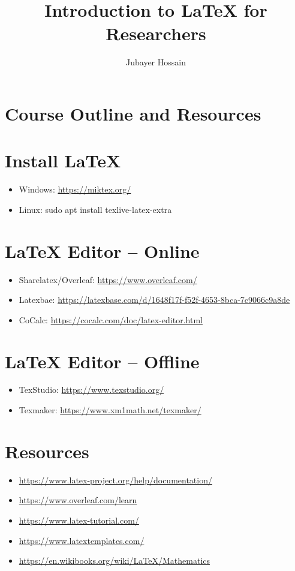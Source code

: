 \documentclass[a4paper, 12pt]{article}
\title{Introduction to {\LaTeX} for Researchers}
\author{\LARGE Jubayer Hossain}
\begin{document}
\maketitle 
\section*{\LARGE Course Outline and Resources}


\section*{Install \LaTeX} 
\begin{itemize}
	\item Windows: \url{https://miktex.org/}
	\item Linux: sudo apt install texlive-latex-extra
\end{itemize}


\section*{{\LaTeX} Editor -- Online}
\begin{itemize}
	\item Sharelatex/Overleaf: \url{https://www.overleaf.com/}
	\item Latexbae: 
	\url{https://latexbase.com/d/1648f17f-f52f-4653-8bca-7c9066c9a8de}
	\item CoCalc: \url{https://cocalc.com/doc/latex-editor.html}
\end{itemize}


\section*{{\LaTeX} Editor -- Offline}
\begin{itemize}
	\item TexStudio: \url{https://www.texstudio.org/}
	\item Texmaker: \url{https://www.xm1math.net/texmaker/}
\end{itemize}


\section*{Resources} 
\begin{itemize}
	\item \url{https://www.latex-project.org/help/documentation/}
	\item \url{https://www.overleaf.com/learn}
	\item \url{https://www.latex-tutorial.com/}
	\item \url{https://www.latextemplates.com/} 
	\item \url{https://en.wikibooks.org/wiki/LaTeX/Mathematics}
\end{itemize}
\end{document}
